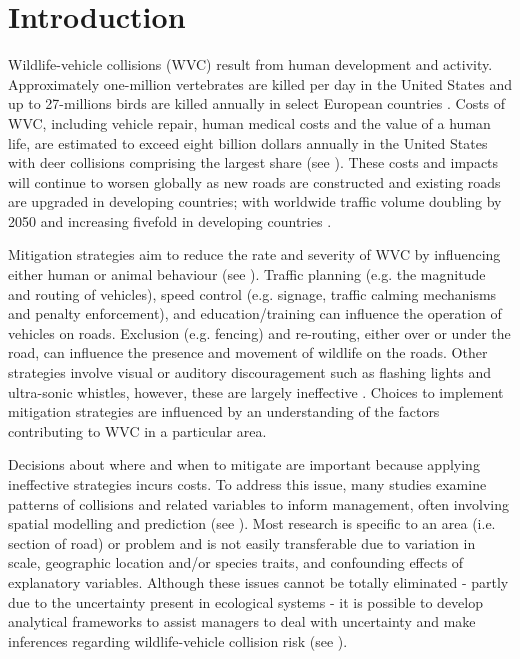 \newpage
\section{Introduction}

Wildlife-vehicle collisions (WVC) result from human development and activity. Approximately one-million vertebrates are killed per day in the United States \citep{form98} and up to 27-millions birds are killed annually in select European countries \citep{erri03}.  Costs of WVC, including vehicle repair, human medical costs and the value of a human life, are estimated to exceed eight billion dollars annually in the United States \citep{huij07b} with deer collisions comprising the largest share (see \cite{biss08b}).  These costs and impacts will continue to worsen globally as new roads are constructed and existing roads are upgraded in developing countries; with worldwide traffic volume doubling by 2050 and increasing fivefold in developing countries \citep{rvdr15}.

Mitigation strategies aim to reduce the rate and severity of WVC by influencing either human or animal behaviour (see \cite{huij10}).  Traffic planning (e.g. the magnitude and routing of vehicles), speed control (e.g. signage, traffic calming mechanisms and penalty enforcement), and education/training can influence the operation of vehicles on roads.  Exclusion (e.g. fencing) and re-routing, either over or under the road, can influence the presence and movement of wildlife on the roads.  Other strategies involve visual or auditory discouragement such as flashing lights and ultra-sonic whistles, however, these are largely ineffective \citep{reev93,bend03,sche03,ramp06c}. Choices to implement mitigation strategies are influenced by an understanding of the factors contributing to WVC in a particular area.

Decisions about where and when to mitigate are important because applying ineffective strategies incurs costs.  To address this issue, many studies examine patterns of collisions and related variables to inform management, often involving spatial modelling and prediction (see \cite{guns11}).  Most research is specific to an area (i.e. section of road) or problem and is not easily transferable due to variation in scale, geographic location and/or species traits, and confounding effects of explanatory variables.  Although these issues cannot be totally eliminated - partly due to the uncertainty present in ecological systems - it is possible to develop analytical frameworks to assist managers to deal with uncertainty and make inferences regarding wildlife-vehicle collision risk (see ).


